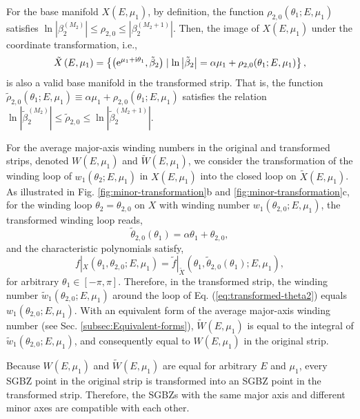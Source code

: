 \documentclass[pdflatex,sn-nature, iicol]{sn-jnl}%
\theoremstyle{thmstyleone}%
\theoremstyle{thmstyletwo}%
\theoremstyle{thmstylethree}%
\begin{document}
For the base manifold $X(E,\mu_{1})$, by definition, the function
$\rho_{2,0}(\theta_{1};E,\mu_{1})$  satisfies $\ln\left|\beta_{2}^{(M_{2})}\right|\leq \rho_{2,0}\leq\left|\beta_{2}^{(M_{2}+1)}\right|$.
Then, the image of $X(E,\mu_{1})$ under the coordinate transformation,
i.e., 
\begin{equation}
\tilde{X}\left(E,\mu_{1}\right)=\left\{ \left(\mathrm{e}^{\mu_{1}+\mathrm{i}\theta_{1}},\tilde{\beta}_{2}\right)\mid\ln\left|\tilde{\beta}_{2}\right|=\alpha\mu_{1}+\rho_{2,0}(\theta_{1};E,\mu_{1})\right\} ,
\end{equation}
is also a valid base manifold in the transformed strip. That is, the
function $\tilde{\rho}_{2,0}\left(\theta_{1};E,\mu_{1}\right)\equiv\alpha\mu_{1}+\rho_{2,0}(\theta_{1};E,\mu_{1})$
satisfies the relation $\ln|\tilde{\beta}_{2}^{(M_{2})}|\leq\tilde{\rho}_{2,0}\leq\ln|\tilde{\beta}_{2}^{(M_{2}+1)}|$.

For the average major-axis winding numbers in the original and transformed strips,
denoted $W(E,\mu_1)$ and $\tilde{W}(E,\mu_1)$, we consider the transformation
of the winding loop of $w_{1}(\theta_{2};E,\mu_{1})$ in $X(E,\mu_{1})$
into the closed loop on $\tilde{X}(E,\mu_{1})$. As illustrated in
Fig. \ref{fig:minor-transformation}b and \ref{fig:minor-transformation}c,
for the winding loop $\theta_{2}=\theta_{2,0}$ on $X$ with winding
number $w_{1}(\theta_{2,0};E,\mu_{1})$, the transformed winding loop
reads, 
\begin{equation}
\tilde{\theta}_{2,0}\left(\theta_{1}\right)=\alpha\theta_{1}+\theta_{2,0},\label{eq:transformed-theta2}
\end{equation}
and the characteristic polynomials satisfy, 
\begin{equation}
f|_{X}\left(\theta_{1},\theta_{2,0};E,\mu_{1}\right)=\tilde{f}|_{\tilde{X}}\left(\theta_{1},\tilde{\theta}_{2,0}\left(\theta_{1}\right);E,\mu_{1}\right),\label{eq:relation-ChP}
\end{equation}
for arbitrary $\theta_{1}\in\left[-\pi,\pi\right]$. Therefore, in
the transformed strip, the winding number $\tilde{w}_{1}(\theta_{2,0};E,\mu_{1})$
around the loop of Eq. (\ref{eq:transformed-theta2}) equals $w_{1}(\theta_{2,0};E,\mu_{1})$.
With an equivalent form of the average major-axis winding number (see Sec. \ref{subsec:Equivalent-forms}),
$\tilde{W}(E,\mu_{1})$ is equal to the integral of $\tilde{w}_{1}(\theta_{2,0};E,\mu_{1})$,
and consequently equal to $W(E,\mu_{1})$ in the original strip.

Because $W(E,\mu_{1})$ and $\tilde{W}(E,\mu_{1})$
are equal for arbitrary $E$ and $\mu_{1}$, every SGBZ point in the
original strip is transformed into an SGBZ point in the transformed
strip. Therefore, the SGBZs with the same major axis and different
minor axes are compatible with each other.
\end{document}
